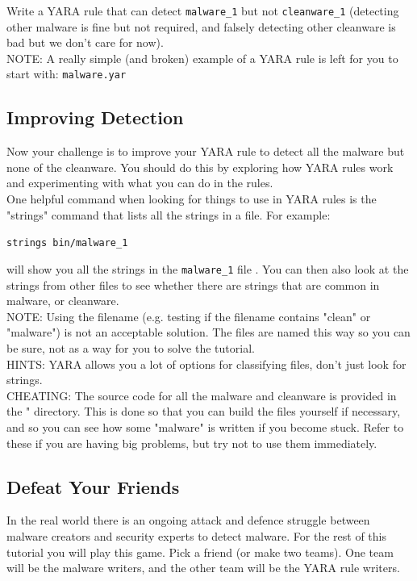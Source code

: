 \documentclass{article}
\begin{document}
\noindent Write a YARA rule that can detect \lstinline{malware_1} but not \lstinline{cleanware_1} (detecting other malware is fine but not required, and falsely detecting other
cleanware is bad but we don't care for now).\\

\noindent NOTE: A really simple (and broken) example of a YARA rule is left for
you to start with: \lstinline{malware.yar}

\subsection{Improving Detection}
Now your challenge is to improve your YARA rule to detect all the malware
but none of the cleanware. You should do this by exploring how YARA rules
work and experimenting with what you can do in the rules.\\

\noindent One helpful command when looking for things to use in YARA rules is
the "strings" command that lists all the strings in a file. For example:
\begin{center}
    \lstinline{strings bin/malware_1}
\end{center}
\noindent will show you all the strings in the \lstinline{malware_1} file . You can then also look at the strings from other files to see whether there are strings that are common in malware, or cleanware.\\

\noindent NOTE: Using the filename (e.g. testing if the filename contains "clean"
or "malware") is not an acceptable solution. The files are named this way so
you can be sure, not as a way for you to solve the tutorial.\\

\noindent HINTS: YARA allows you a lot of options for classifying files, don't just
look for strings.\\

\noindent CHEATING: The source code for all the malware and cleanware is
provided in the \src" directory. This is done so that you can build the files
yourself if necessary, and so you can see how some "malware" is written if
you become stuck. Refer to these if you are having big problems, but try not
to use them immediately.

\subsection{Defeat Your Friends}
In the real world there is an ongoing attack and defence struggle between
malware creators and security experts to detect malware. For the rest of this
tutorial you will play this game. Pick a friend (or make two teams). One
team will be the malware writers, and the other team will be the YARA rule
writers.\\
\end{document}
